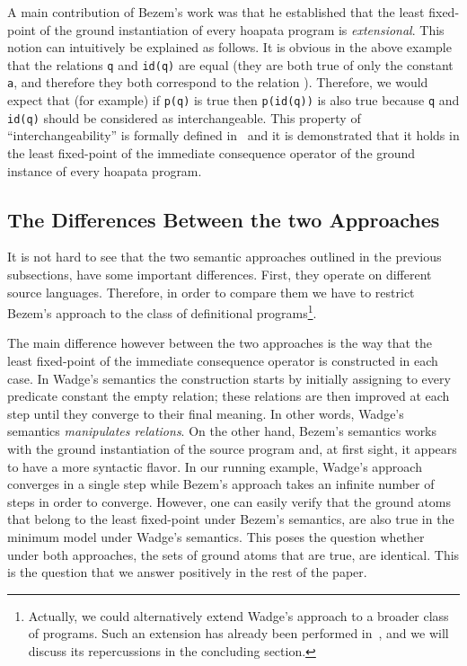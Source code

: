 \documentclass[submission,copyright]{eptcs}
\theoremstyle{definition}
\begin{document}
A main contribution of Bezem's work was that he established that the least fixed-point
of the ground instantiation of every hoapata program is {\em extensional}. This notion
can intuitively be explained as follows. It is obvious in the
above example that the relations {\tt q} and {\tt id(q)} are equal (they are both true of only the
constant {\tt a}, and therefore they both correspond to the relation ).
Therefore, we would expect that (for example) if {\tt p(q)} is true then {\tt p(id(q))}
is also true because {\tt q} and {\tt id(q)} should be considered as interchangeable.
This property of ``interchangeability'' is formally defined in~\cite{Bezem99,Bezem01} and it is
demonstrated that it holds in the least fixed-point of the immediate consequence operator
of the ground instance of every hoapata program.

\subsection{The Differences Between the two Approaches}
It is not hard to see that the two semantic approaches outlined in the previous
subsections, have some important differences. First, they operate on different
source languages. Therefore, in order to compare them we have to restrict Bezem's
approach to the class of definitional programs\footnote{Actually, we could alternatively
extend Wadge's approach to a broader class of programs. Such an extension has already
been performed in~\cite{CharalambidisHRW13}, and we will discuss its repercussions in the
concluding section.}.

The main difference however between the two approaches is the way that the least
fixed-point of the immediate consequence operator is constructed in each case.
In Wadge's semantics the construction starts by initially assigning to every predicate
constant the empty relation; these relations are then improved at each step until
they converge to their final meaning. In other words, Wadge's semantics {\em manipulates
relations}. On the other hand, Bezem's semantics works with the ground instantiation
of the source program and, at first sight, it appears to have a more syntactic flavor.
In our running example, Wadge's approach converges in a single step while Bezem's
approach takes an infinite number of steps in order to converge. However, one can easily verify that
the ground atoms that belong to the least fixed-point under Bezem's semantics, are also
true in the minimum model under Wadge's semantics. This poses the question whether
under both approaches, the sets of ground atoms that are true, are identical.
This is the question that we answer positively in the rest of the paper.
\end{document}
